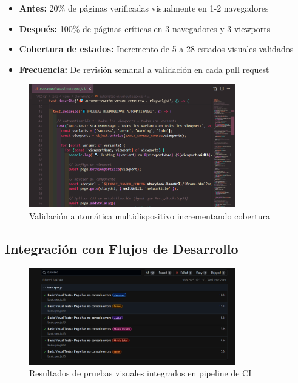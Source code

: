 \documentclass{article}
\begin{document}
\begin{itemize}[nosep]
\item \textbf{Antes:} 20\% de páginas verificadas visualmente en 1-2 navegadores
\item \textbf{Después:} 100\% de páginas críticas en 3 navegadores y 3 viewports
\item \textbf{Cobertura de estados:} Incremento de 5 a 28 estados visuales validados
\item \textbf{Frecuencia:} De revisión semanal a validación en cada pull request
\end{itemize}

\begin{figure}[H]
\centering
\includegraphics[width=0.8\textwidth]{playwright/3Automatizacion_Responsive.png}
\caption{Validación automática multidispositivo incrementando cobertura}
\label{fig:coverage-increase}
\end{figure}

\subsection{Integración con Flujos de Desarrollo}

\begin{figure}[H]
\centering
\includegraphics[width=0.8\textwidth]{playwright/passed_results.png}
\caption{Resultados de pruebas visuales integrados en pipeline de CI}
\label{fig:ci-integration}
\end{figure}
\end{document}
